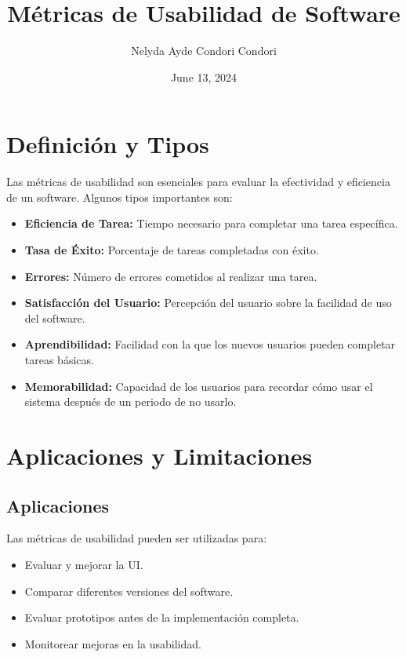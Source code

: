 \documentclass{article}
\title{Métricas de Usabilidad de Software}
\author{Nelyda Ayde Condori Condori}
\date{June 13, 2024}
\begin{document}
\maketitle

\section{Definición y Tipos}

Las métricas de usabilidad son esenciales para evaluar la efectividad y eficiencia
de un software. Algunos tipos importantes son:

\begin{itemize}
    \item \textbf{Eficiencia de Tarea:} Tiempo necesario para completar una tarea específica.
    \item \textbf{Tasa de Éxito:} Porcentaje de tareas completadas con éxito.
    \item \textbf{Errores:} Número de errores cometidos al realizar una tarea.
    \item \textbf{Satisfacción del Usuario:} Percepción del usuario sobre la facilidad de uso del software.
    \item \textbf{Aprendibilidad:} Facilidad con la que los nuevos usuarios pueden completar tareas básicas.
    \item \textbf{Memorabilidad:} Capacidad de los usuarios para recordar cómo usar el sistema después de un periodo de no usarlo.
\end{itemize}

\section{Aplicaciones y Limitaciones}

\subsection{Aplicaciones}

Las métricas de usabilidad pueden ser utilizadas para:

\begin{itemize}
    \item Evaluar y mejorar la UI.
    \item Comparar diferentes versiones del software.
    \item Evaluar prototipos antes de la implementación completa.
    \item Monitorear mejoras en la usabilidad.
\end{itemize}
\end{document}
